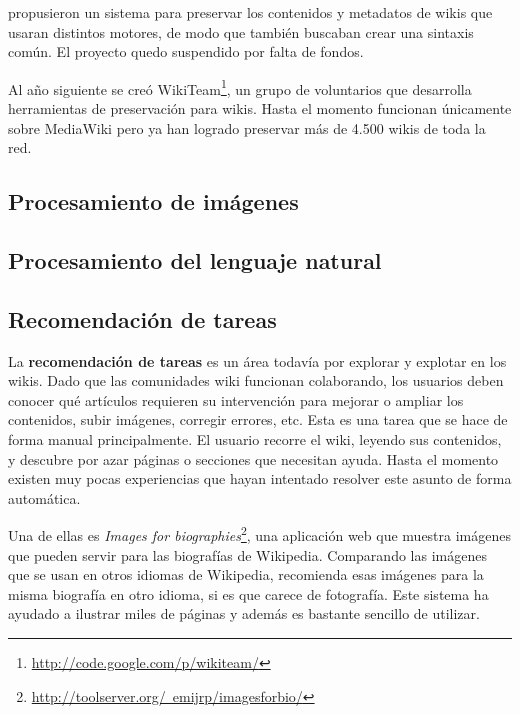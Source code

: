 \documentclass[11pt,onecolumn]{article}
\begin{document}
\citep{popitsch2010} propusieron un sistema para preservar los contenidos y metadatos de wikis que usaran distintos motores, de modo que también buscaban crear una sintaxis común. El proyecto quedo suspendido por falta de fondos.


Al año siguiente se creó WikiTeam\footnote{\href{http://code.google.com/p/wikiteam/}{http://code.google.com/p/wikiteam/}}, un grupo de voluntarios que desarrolla herramientas de preservación para wikis. Hasta el momento funcionan únicamente sobre MediaWiki pero ya han logrado preservar más de 4.500 wikis de toda la red.

\subsection{Procesamiento de imágenes}


\subsection{Procesamiento del lenguaje natural}


\subsection{Recomendación de tareas}

La \textbf{recomendación de tareas} es un área todavía por explorar y explotar en los wikis. Dado que las comunidades wiki funcionan colaborando, los usuarios deben conocer qué artículos requieren su intervención para mejorar o ampliar los contenidos, subir imágenes, corregir errores, etc. Esta es una tarea que se hace de forma manual principalmente. El usuario recorre el wiki, leyendo sus contenidos, y descubre por azar páginas o secciones que necesitan ayuda. Hasta el momento existen muy pocas experiencias que hayan intentado resolver este asunto de forma automática.



Una de ellas es \emph{Images for biographies}\footnote{\href{http://toolserver.org/~emijrp/imagesforbio/}{http://toolserver.org/~emijrp/imagesforbio/}}, una aplicación web que muestra imágenes que pueden servir para las biografías de Wikipedia. Comparando las imágenes que se usan en otros idiomas de Wikipedia, recomienda esas imágenes para la misma biografía en otro idioma, si es que carece de fotografía. Este sistema ha ayudado a ilustrar miles de páginas y además es bastante sencillo de utilizar.
\end{document}
